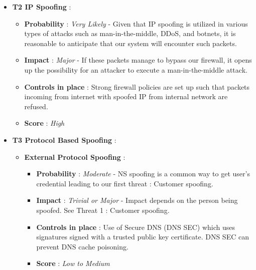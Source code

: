 \documentclass[12pt]{article}
\begin{document}
\begin{itemize}
    \item \textbf{ T2 IP Spoofing }: 
         \begin{itemize}
                \item  \textbf{ Probability }: \textit{Very Likely} - Given that IP spoofing is utilized in various types of attacks such as man-in-the-middle, DDoS, and botnets, it is reasonable to anticipate that our system will encounter such packets.
                \item  \textbf{ Impact }:  \textit{Major} - If these packets manage to bypass our firewall, it opens up the possibility for an attacker to execute a man-in-the-middle attack.
                \item \textbf{ Controls in place }: Strong firewall policies are set up such that packets incoming from internet with spoofed IP from internal network are refused.
                \item \textbf{ Score } : \textit{High}
        \end{itemize}

    \item \textbf{ T3 Protocol Based Spoofing }:
        \begin{itemize}
            \item  \textbf{ External Protocol Spoofing }:

            \begin{itemize}
                \item  \textbf{ Probability }: \textit{Moderate} - NS spoofing is a common way to get user’s credential leading to our first threat : Customer spoofing.
                \item  \textbf{ Impact }: \textit{Trivial or Major } - Impact depends on the person being spoofed. See Threat 1 : Customer spoofing.
                \item \textbf{ Controls in place }: Use of Secure DNS (DNS SEC) which uses signatures signed with a trusted public key certificate. DNS SEC can prevent DNS cache poisoning.
                \item \textbf{ Score } : \textit{Low to Medium}
            \end{itemize}
            

\end{itemize}
\end{itemize}
\end{document}
